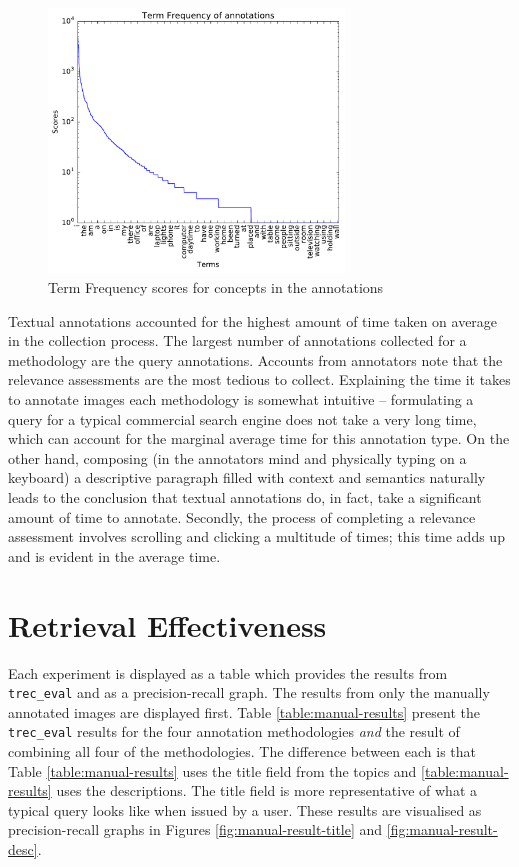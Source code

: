 \begin{figure}[b]
    \centering
    \includegraphics[width=0.7\textwidth]{graphs/tf-scores}
    \caption{Term Frequency scores for concepts in the annotations}
    \label{fig:tf-scores}
\end{figure}

Textual annotations accounted for the highest amount of time taken on average in the collection process. The largest number of annotations collected for a methodology are the query annotations. Accounts from annotators note that the relevance assessments are the most tedious to collect. Explaining the time it takes to annotate images each methodology is somewhat intuitive -- formulating a query for a typical commercial search engine does not take a very long time, which can account for the marginal average time for this annotation type. On the other hand, composing (in the annotators mind and physically typing on a keyboard) a descriptive paragraph filled with context and semantics naturally leads to the conclusion that textual annotations do, in fact, take a significant amount of time to annotate. Secondly, the process of completing a relevance assessment involves scrolling and clicking a multitude of times; this time adds up and is evident in the average time.

\FloatBarrier
\section{Retrieval Effectiveness}

Each experiment is displayed as a table which provides the results from \verb|trec_eval| and as a precision-recall graph. The results from only the manually annotated images are displayed first. Table \ref{table:manual-results} present the \verb|trec_eval| results for the four annotation methodologies \textit{and} the result of combining all four of the methodologies. The difference between each is that Table \ref{table:manual-results} uses the title field from the topics and \ref{table:manual-results} uses the descriptions. The title field is more representative of what a typical query looks like when issued by a user. These results are visualised as precision-recall graphs in Figures \ref{fig:manual-result-title} and \ref{fig:manual-result-desc}.

